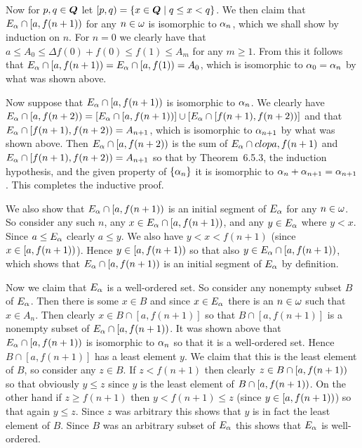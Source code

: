{{    Now for $p,q \in {\boldsymbol{Q}}$ let $[p,q) = \left\{ x \in {\boldsymbol{Q}} \mid q \leq x < q \right\}$.
    We then claim that $E_\alpha \cap [a, f(n+1))$ for any $n \in \omega$ is isomorphic to $\alpha_n$, which we shall show by induction on $n$.
    For $n=0$ we clearly have that $a \leq A_0 \leq \Delta f(0) + f(0) \leq f(1) \leq A_m$ for any $m \geq 1$.
    From this it follows that $E_\alpha \cap [a, f(n+1)) = E_\alpha \cap [a, f(1)) = A_0$, which is isomorphic to $\alpha_0 = \alpha_n$ by what was shown above.

    Now suppose that $E_\alpha \cap [a, f(n+1))$ is isomorphic to $\alpha_n$.
    We clearly have $E_\alpha \cap [a, f(n+2)) = \left[ E_\alpha \cap [a, f(n+1)) \right] \cup \left[ E_\alpha \cap [f(n+1), f(n+2)) \right]$ and that $E_\alpha \cap [f(n+1), f(n+2)) = A_{n+1}$, which is isomorphic to $\alpha_{n+1}$ by what was shown above.
    Then $E_\alpha \cap [a, f(n+2))$ is the sum of $E_\alpha \cap clop{a, f(n+1)}$ and $E_\alpha \cap [f(n+1), f(n+2)) = A_{n+1}$ so that by Theorem~6.5.3, the induction hypothesis, and the given property of $\left\{ \alpha_n \right\}$ it is isomorphic to $\alpha_n + \alpha_{n+1} = \alpha_{n+1}$.
    This completes the inductive proof.

    We also show that $E_\alpha \cap [a, f(n+1))$ is an initial segment of $E_\alpha$ for any $n \in \omega$.
    So consider any such $n$, any $x \in E_\alpha \cap [a, f(n+1))$, and any $y \in E_\alpha$ where $y < x$.
    Since $a \leq E_\alpha$ clearly $a \leq y$.
    We also have $y < x < f(n+1)$ (since $x \in [a, f(n+1))$).
    Hence $y \in [a, f(n+1))$ so that also $y \in E_\alpha \cap [a, f(n+1))$, which shows that $E_\alpha \cap [a, f(n+1))$ is an initial segment of $E_\alpha$ by definition.

    Now we claim that $E_\alpha$ is a well-ordered set.
    So consider any nonempty subset $B$ of $E_\alpha$.
    Then there is some $x \in B$ and since $x \in E_\alpha$ there is an $n \in \omega$ such that $x \in A_n$.
    Then clearly $x \in B \cap [a, f(n+1)]$ so that $B \cap [a, f(n+1)]$ is a nonempty subset of $E_\alpha \cap [a, f(n+1))$.
    It was shown above that $E_\alpha \cap [a, f(n+1))$ is isomorphic to $\alpha_n$ so that it is a well-ordered set.
    Hence $B \cap [a, f(n+1)]$ has a least element $y$.
    We claim that this is the least element of $B$, so consider any $z \in B$.
    If $z < f(n+1)$ then clearly $z \in B \cap [a, f(n+1))$ so that obviously $y \leq z$ since $y$ is the least element of $B \cap [a, f(n+1))$.
    On the other hand if $z \geq f(n+1)$ then $y < f(n+1) \leq z$ (since $y \in [a, f(n+1))$) so that again $y \leq z$.
    Since $z$ was arbitrary this shows that $y$ is in fact the least element of $B$.
    Since $B$ was an arbitrary subset of $E_\alpha$ this shows that $E_\alpha$ is well-ordered.

}}
